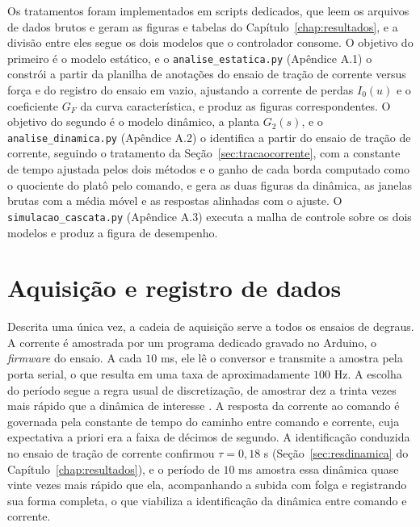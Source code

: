 Os tratamentos foram implementados em scripts dedicados, que leem os arquivos de dados
brutos e geram as figuras e tabelas do Capítulo~\ref{chap:resultados}, e a divisão entre
eles segue os dois modelos que o controlador consome. O objetivo do primeiro é o modelo
estático, e o \texttt{analise\_estatica.py} (Apêndice A.1) o constrói a partir da planilha
de anotações do ensaio de tração de corrente versus força e do registro do ensaio em vazio,
ajustando a corrente de perdas $I_0(u)$ e o coeficiente $G_F$ da curva característica, e
produz as figuras correspondentes. O objetivo do segundo é o modelo dinâmico, a planta
$G_2(s)$, e o \texttt{analise\_dinamica.py} (Apêndice A.2) o identifica a partir do ensaio
de tração de corrente, seguindo o tratamento da Seção~\ref{sec:tracaocorrente}, com a
constante de tempo ajustada pelos dois métodos e o ganho de cada borda computado como o
quociente do platô pelo comando, e gera as duas figuras da dinâmica, as janelas brutas com
a média móvel e as respostas alinhadas com o ajuste. O \texttt{simulacao\_cascata.py}
(Apêndice A.3) executa a malha de controle sobre os dois modelos e produz a figura de
desempenho.

\section{Aquisição e registro de dados}
\label{sec:registro}

Descrita uma única vez, a cadeia de aquisição serve a todos os ensaios de degraus. A
corrente é amostrada por um programa dedicado gravado no Arduino, o \emph{firmware} do
ensaio. A cada $10$ ms, ele lê o conversor e transmite a amostra pela porta serial, o que
resulta em uma taxa de aproximadamente $100$ Hz. A escolha do período segue a regra usual
de discretização, de amostrar dez a trinta vezes mais rápido que a dinâmica de interesse
\cite{raffo_tcpi_sintese}. A resposta da corrente ao comando é governada pela constante
de tempo do caminho entre comando e corrente, cuja expectativa a priori era a faixa de décimos de
segundo. A identificação conduzida no ensaio de tração de corrente confirmou $\tau = 0{,}18$ s
(Seção~\ref{sec:resdinamica} do Capítulo~\ref{chap:resultados}), e o período de
$10$ ms amostra essa dinâmica quase vinte vezes mais rápido que ela, acompanhando a subida
com folga e registrando sua forma completa, o que viabiliza a identificação da dinâmica
entre comando e corrente.

